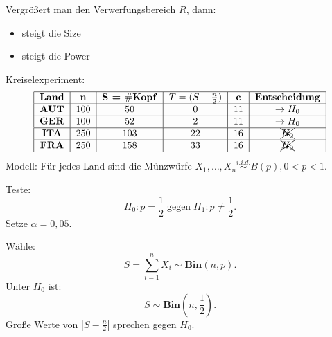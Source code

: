 \documentclass[10pt]{article}
\newcommand{\FZV}{X_1, \ldots, X_n} %
\newenvironment{BSP}[1][]
{\begin{Beispiel}[frametitle=#1]}{\end{Beispiel}}
\begin{document}
	\begin{Bemerkung}
		Vergrößert man den Verwerfungsbereich $R$, dann:
		\begin{itemize}
			\item steigt die Size 
			\item steigt die Power
		\end{itemize}
	\end{Bemerkung}
	
	\begin{BSP}[Beispiel 2.0.1 (Ist der Euro fair?)]
		Kreiselexperiment:
		\begin{align*}
			\begin{tabular}{|c|c|c|c|c|c|c|}
				\hline
				\textbf{Land} & \textbf{n} & \textbf{S = $\#$Kopf} & \textbf{$T = (S - \frac{n}{2})$} & \textbf{c} & \textbf{Entscheidung}\\
				\hline
				\textbf{AUT} & 100 & 50 & 0 & 11 & $\rightarrow H_0$\\
				\hline
				\textbf{GER} & 100 & 52 & 2 & 11 & $\rightarrow H_0$\\
				\hline
				\textbf{ITA} & 250 & 103 & 22 & 16 &$\xcancel{H_0}$\\
				\hline
				\textbf{FRA} & 250 & 158 & 33 & 16 &$\xcancel{H_0}$\\
				\hline
			\end{tabular}
		\end{align*}
		Modell: Für jedes Land sind die Münzwürfe $\FZV \overset{i.i.d.}{\sim} B(p), 0<p<1$.
		
		Teste:
		\begin{equation*}
			H_0: p = \frac{1}{2} \; \text{gegen} \; H_1: p \neq \frac{1}{2}.
		\end{equation*}
		Setze $\alpha = 0,05$.
		
		Wähle:
		\begin{equation*}
			S = \sum_{i = 1}^{n} X_i \sim \textbf{Bin}(n,p).
		\end{equation*}
		Unter $H_0$ ist:
		\begin{equation*}
			S \sim \textbf{Bin}\left(n, \frac{1}{2}\right).
		\end{equation*}
		Große Werte von $\left\vert S - \frac{n}{2} \right\vert$ sprechen gegen $H_0$. 
		

\end{BSP}
\end{document}
